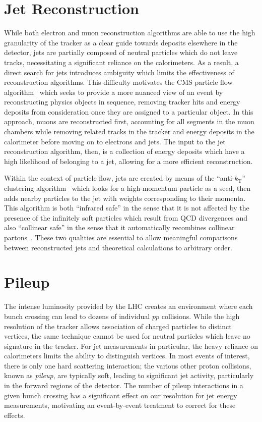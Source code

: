 \section{Jet Reconstruction}
\label{sec:jet-reco}

While both electron and muon reconstruction algorithms are able to use the high granularity of the tracker as a clear guide towards deposits elsewhere in the detector, jets are partially composed of neutral particles which do not leave tracks, necessitating a significant reliance on the calorimeters.  As a result, a direct search for jets introduces ambiguity which limits the effectiveness of reconstruction algorithms.  This difficulty motivates the CMS particle flow algorithm~\cite{ParticleFlow} which seeks to provide a more nuanced view of an event by reconstructing physics objects in sequence, removing tracker hits and energy deposits from consideration once they are assigned to a particular object.  In this approach, muons are reconstructed first, accounting for all segments in the muon chambers while removing related tracks in the tracker and energy deposits in the calorimeter before moving on to electrons and jets.  The input to the jet reconstruction algorithm, then, is a collection of energy deposits which have a high likelihood of belonging to a jet, allowing for a more efficient reconstruction.

Within the context of particle flow, jets are created by means of the ``anti-$k_\text{T}$'' clustering algorithm~\cite{antikt} which looks for a high-momentum particle as a seed, then adds nearby particles to the jet with weights corresponding to their momenta.  This algorithm is both ``infrared safe'' in the sense that it is not affected by the presence of the infinitely soft particles which result from QCD divergences and also ``collinear safe'' in the sense that it automatically recombines collinear partons~\cite{Ellis:1993tq}.  These two qualities are essential to allow meaningful comparisons between reconstructed jets and theoretical calculations to arbitrary order.  

\section{Pileup}
\label{sec:pileup}

The intense luminosity provided by the LHC creates an environment where each bunch crossing can lead to dozens of individual $pp$ collisions.  While the high resolution of the tracker allows association of charged particles to distinct vertices, the same technique cannot be used for neutral particles which leave no signature in the tracker.  For jet measurements in particular, the heavy reliance on calorimeters limits the ability to distinguish vertices.  In most events of interest, there is only one hard scattering interaction; the various other proton collisions, known as \emph{pileup}, are typically soft, leading to significant jet activity, particularly in the forward regions of the detector.  The number of pileup interactions in a given bunch crossing has a significant effect on our resolution for jet energy measurements, motivating an event-by-event treatment to correct for these effects.

